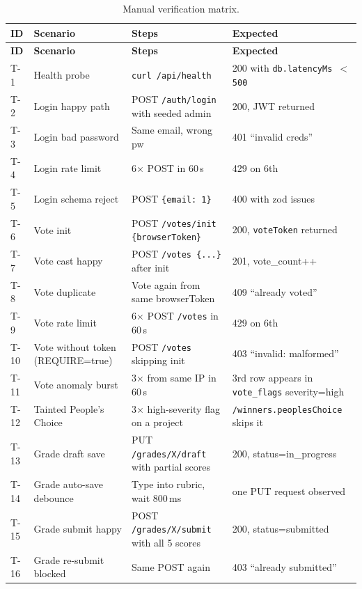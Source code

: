 \begin{longtable}{p{}p{}p{}p{}}
  \caption{Manual verification matrix.}\label{tab:verify}\\
  \toprule
  \textbf{ID} & \textbf{Scenario} & \textbf{Steps} & \textbf{Expected} \\
  \midrule
  \endfirsthead
  \toprule
  \textbf{ID} & \textbf{Scenario} & \textbf{Steps} & \textbf{Expected} \\
  \midrule
  \endhead

  T-1 & Health probe & \texttt{curl /api/health} & 200 with \texttt{db.latencyMs $<$ 500} \\
  T-2 & Login happy path & POST \texttt{/auth/login} with seeded admin & 200, JWT returned \\
  T-3 & Login bad password & Same email, wrong pw & 401 ``invalid creds'' \\
  T-4 & Login rate limit & 6× POST in 60\,s & 429 on 6th \\
  T-5 & Login schema reject & POST \texttt{\{email: 1\}} & 400 with zod issues \\
  T-6 & Vote init & POST \texttt{/votes/init \{browserToken\}} & 200, \texttt{voteToken} returned \\
  T-7 & Vote cast happy & POST \texttt{/votes \{...\}} after init & 201, vote\_count++ \\
  T-8 & Vote duplicate & Vote again from same browserToken & 409 ``already voted'' \\
  T-9 & Vote rate limit & 6× POST \texttt{/votes} in 60\,s & 429 on 6th \\
  T-10 & Vote without token (REQUIRE=true) & POST \texttt{/votes} skipping init & 403 ``invalid: malformed'' \\
  T-11 & Vote anomaly burst & 3× from same IP in 60\,s & 3rd row appears in \texttt{vote\_flags} severity=high \\
  T-12 & Tainted People's Choice & 3× high-severity flag on a project & \texttt{/winners.peoplesChoice} skips it \\
  T-13 & Grade draft save & PUT \texttt{/grades/X/draft} with partial scores & 200, status=in\_progress \\
  T-14 & Grade auto-save debounce & Type into rubric, wait 800\,ms & one PUT request observed \\
  T-15 & Grade submit happy & POST \texttt{/grades/X/submit} with all 5 scores & 200, status=submitted \\
  T-16 & Grade re-submit blocked & Same POST again & 403 ``already submitted'' \\

\end{longtable}
